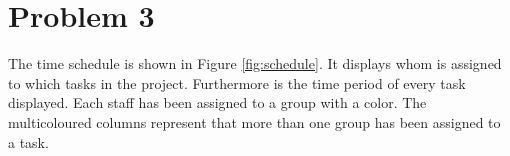 \chapter{Problem 3}

The time schedule is shown in Figure \ref{fig:schedule}. It displays whom is assigned to which tasks in the project. Furthermore is the time period of every task displayed.
Each staff has been assigned to a group with a color.
The multicoloured columns represent that more than one group has been assigned to a task.
